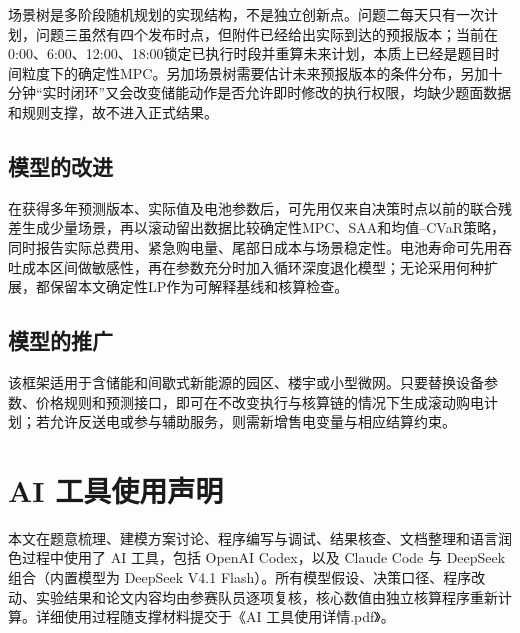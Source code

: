 \documentclass[withoutpreface,bwprint]{cumcmthesis}
\begin{document}
场景树是多阶段随机规划的实现结构，不是独立创新点。问题二每天只有一次计划，问题三虽然有四个发布时点，但附件已经给出实际到达的预报版本；当前在0:00、6:00、12:00、18:00锁定已执行时段并重算未来计划，本质上已经是题目时间粒度下的确定性MPC。另加场景树需要估计未来预报版本的条件分布，另加十分钟“实时闭环”又会改变储能动作是否允许即时修改的执行权限，均缺少题面数据和规则支撑，故不进入正式结果。



\subsection{模型的改进}

在获得多年预测版本、实际值及电池参数后，可先用仅来自决策时点以前的联合残差生成少量场景，再以滚动留出数据比较确定性MPC、SAA和均值--CVaR策略，同时报告实际总费用、紧急购电量、尾部日成本与场景稳定性。电池寿命可先用吞吐成本区间做敏感性，再在参数充分时加入循环深度退化模型；无论采用何种扩展，都保留本文确定性LP作为可解释基线和核算检查。

\subsection{模型的推广}

该框架适用于含储能和间歇式新能源的园区、楼宇或小型微网。只要替换设备参数、价格规则和预测接口，即可在不改变执行与核算链的情况下生成滚动购电计划；若允许反送电或参与辅助服务，则需新增售电变量与相应结算约束。

\section*{AI 工具使用声明}

本文在题意梳理、建模方案讨论、程序编写与调试、结果核查、文档整理和语言润色过程中使用了 AI 工具，包括 OpenAI Codex，以及 Claude Code 与 DeepSeek 组合（内置模型为 DeepSeek V4.1 Flash）。所有模型假设、决策口径、程序改动、实验结果和论文内容均由参赛队员逐项复核，核心数值由独立核算程序重新计算。详细使用过程随支撑材料提交于《AI 工具使用详情.pdf》。








\end{document}
